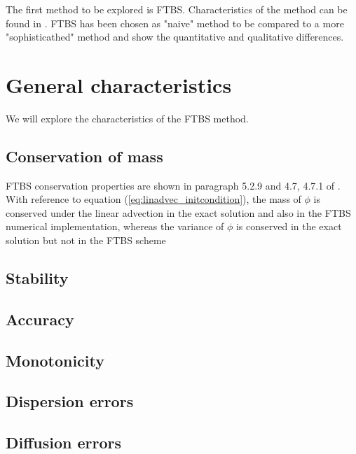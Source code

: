 

The first method to be explored is FTBS. Characteristics of the method can be found in \cite{mpebook}.
FTBS has been chosen as "naive" method to be compared to a more "sophisticathed" method and show the quantitative and qualitative differences.

\section{General characteristics}
We will explore the characteristics of the FTBS method.

\subsection{Conservation of mass}
FTBS conservation properties are shown in paragraph 5.2.9 \cite{mpebook} and 4.7, 4.7.1 of \cite{nmnotes}. With reference to equation (\ref{eq:linadvec_initcondition}), the mass of $\phi$ is conserved under the linear advection in the exact solution and also in the FTBS numerical implementation, whereas the variance of $\phi$ is conserved in the exact solution but not in the FTBS scheme

\subsection{Stability}

\subsection{Accuracy}

\subsection{Monotonicity}

\subsection{Dispersion errors}

\subsection{Diffusion errors}

